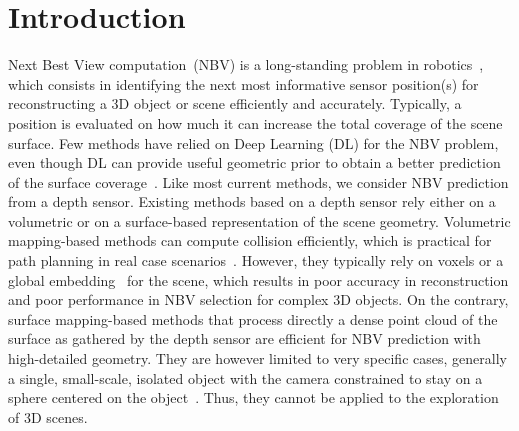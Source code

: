 \section{Introduction}

Next Best View computation~(NBV) is a long-standing problem in robotics~\cite{connolly-father-paper, yamauchi-97}, which consists in identifying the next most informative sensor position(s) for reconstructing a 3D object or scene efficiently and accurately. Typically, a position is evaluated on how much it can increase the total coverage of the scene surface. 
Few methods have relied on Deep Learning (DL) for the NBV problem, even though DL can provide useful geometric prior to obtain a better prediction of the surface coverage~\cite{zeng-icirs20-pcnbv, Mendoza-2019, vasquez-21-3DCNN}. 
Like most current methods, we consider NBV prediction from a depth sensor. Existing methods based on a depth sensor rely either on a volumetric or on a surface-based representation of the scene geometry. Volumetric mapping-based methods can compute collision efficiently, which is practical for path planning in real case scenarios~\cite{potthast-14-probabilistic-framework, vasquez-14-volumetric-nbv, vasquez-17-view-state-planning, kriegel-12-next-best-scan, bissmarck-15-efficient-nbv, daudelin-17-adaptable-probabilistic}. However, they typically rely on voxels or a global embedding~\cite{hepp-corr18-learntoscore, charrow-15-information, song-17-online-inspection, song-20-online-coverage, wang-20-efficient-autonomous, cieslewski-17-ICIRS} for the scene, which results in poor accuracy in reconstruction and poor performance in NBV selection for complex 3D objects. On the contrary, surface mapping-based methods that process directly a dense point cloud of the surface as gathered by the depth sensor are efficient for NBV prediction with high-detailed geometry. They are however limited to very specific cases, generally a single, small-scale, isolated object with the camera constrained to stay on a sphere centered on the object~\cite{lee-tra20-mechanical-parts,vasquez-17-view-state-planning, delmerico-18-acomparison, chen-smc05-visionsensorplanning,kriegel-11-surface-based, kriegel-12-next-best-scan,kriegel-12-next-best-scan,zeng-icirs20-pcnbv, Mendoza-2019, vasquez-21-3DCNN}. Thus, they cannot be applied to the exploration of 3D scenes. 




